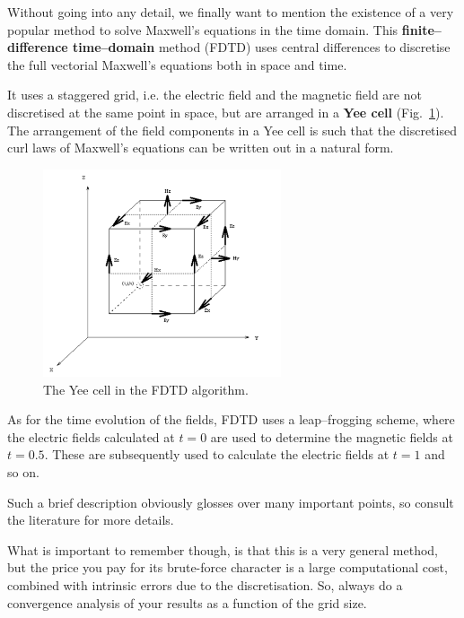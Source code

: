 \label{week6}

Without going into any detail, we finally want to mention the existence of a very popular method to solve Maxwell's equations in the time domain. This \textbf{finite--difference time--domain} method (FDTD) uses central differences to discretise the full vectorial Maxwell's equations both in space and time.

It uses a staggered grid, i.e. the electric field and the magnetic field are not discretised at the same point in space, but are arranged in a \textbf{Yee cell} (Fig.~\ref{fig-yee}). The arrangement of the field components in a Yee cell is such that the discretised curl laws of Maxwell's equations can be written out in a natural form.

\begin{figure}
\centering
\includegraphics[width=7cm]{numeric/figures/yeecell}
\caption{The Yee cell in the FDTD algorithm.}
\label{fig-yee}
\end{figure}

As for the time evolution of the fields, FDTD uses a leap--frogging scheme, where the electric fields calculated at $t=0$ are used to determine the magnetic fields at $t=0.5$. These are subsequently used to calculate the electric fields at $t=1$ and so on.

Such a brief description obviously glosses over many important points, so consult the literature for more details.

What is important to remember though, is that this is a very general method, but the price you pay for its brute-force character is a large computational cost, combined with intrinsic errors due to the discretisation. So, always do a convergence analysis of your results as a function of the grid size.

\pagebreak

